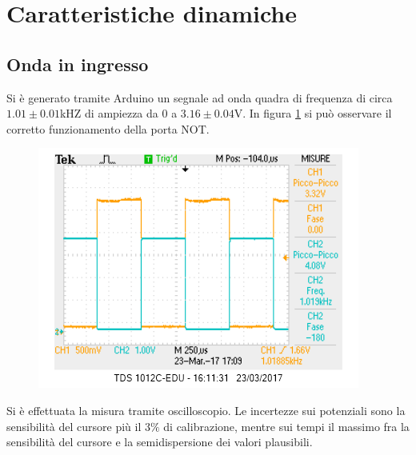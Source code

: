 \documentclass[10pt,a4paper]{article}
\begin{document}
\section{Caratteristiche dinamiche}
\subsection{Onda in ingresso}
Si è generato tramite Arduino un segnale ad onda quadra di frequenza di circa $1.01\pm0.01$kHZ di ampiezza da 0 a $3.16\pm 0.04$V.
In figura \ref{fig:ondanot} si può osservare il corretto funzionamento della porta NOT.
\begin{figure}[!htb]
\centering
\includegraphics[scale=0.7]{ondanot.png}
\caption{\label{fig:ondanot}}
\end{figure}
Si è effettuata la misura tramite oscilloscopio. Le incertezze sui potenziali sono la sensibilità del cursore più il $3\%$ di calibrazione, mentre sui tempi il massimo fra la sensibilità del cursore e la semidispersione dei valori plausibili.
\end{document}
